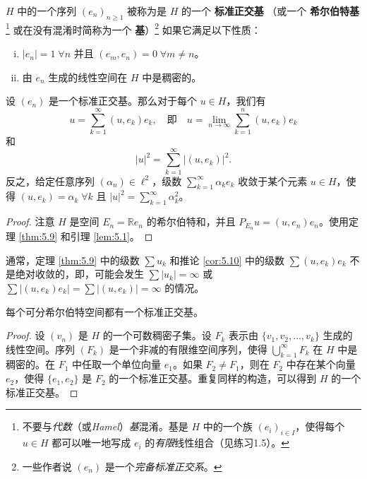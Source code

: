 \begin{definition}
$H$ 中的一个序列 $(e_n)_{n \ge 1}$ 被称为是 $H$ 的一个 \textbf{标准正交基} （或一个 \textbf{希尔伯特基}\footnote{不要与\textit{代数}（或\textit{Hamel}）\textit{基}混淆。基是 $H$ 中的一个族 $(e_i)_{i \in I}$，使得每个 $u \in H$ 都可以唯一地写成 $e_i$ 的\textit{有限}线性组合（见练习1.5）。} 或在没有混淆时简称为一个 \textbf{基}）\footnote{一些作者说 $(e_n)$ 是一个\textit{完备标准正交系}。} 如果它满足以下性质：
\begin{enumerate}[(i)]
    \item $|e_n|=1 \; \forall n$ 并且 $(e_m,e_n)=0 \; \forall m \ne n$。
    \item 由 $e_n$ 生成的线性空间在 $H$ 中是稠密的。
\end{enumerate}
\end{definition}

\begin{corollary}\label{cor:5.10}
设 $(e_n)$ 是一个标准正交基。那么对于每个 $u \in H$，我们有
\[ u = \sum_{k=1}^\infty (u,e_k)e_k, \quad \text{即} \quad u = \lim_{n\to\infty} \sum_{k=1}^n (u,e_k)e_k \]
和
\[ |u|^2 = \sum_{k=1}^\infty |(u,e_k)|^2. \]
反之，给定任意序列 $(\alpha_n) \in \ell^2$，级数 $\sum_{k=1}^\infty \alpha_k e_k$ 收敛于某个元素 $u \in H$，使得 $(u,e_k)=\alpha_k \; \forall k$ 且 $|u|^2 = \sum_{k=1}^\infty \alpha_k^2$。
\end{corollary}
\begin{proof}
注意 $H$ 是空间 $E_n = \mathbb{R} e_n$ 的希尔伯特和，并且 $P_{E_n} u = (u,e_n)e_n$。使用定理 \ref{thm:5.9} 和引理 \ref{lem:5.1}。
\end{proof}

\begin{remark}
通常，定理 \ref{thm:5.9} 中的级数 $\sum u_k$ 和推论 \ref{cor:5.10} 中的级数 $\sum (u,e_k)e_k$ 不是绝对收敛的，即，可能会发生 $\sum |u_k|=\infty$ 或 $\sum |(u,e_k)e_k| = \sum |(u,e_k)| = \infty$ 的情况。
\end{remark}

\begin{theorem}\label{thm:5.11}
每个可分希尔伯特空间都有一个标准正交基。
\end{theorem}
\begin{proof}
设 $(v_n)$ 是 $H$ 的一个可数稠密子集。设 $F_k$ 表示由 $\{v_1, v_2, \dots, v_k\}$ 生成的线性空间。序列 $(F_k)$ 是一个非减的有限维空间序列，使得 $\bigcup_{k=1}^\infty F_k$ 在 $H$ 中是稠密的。在 $F_1$ 中任取一个单位向量 $e_1$。如果 $F_2 \ne F_1$，则在 $F_2$ 中存在某个向量 $e_2$，使得 $\{e_1, e_2\}$ 是 $F_2$ 的一个标准正交基。重复同样的构造，可以得到 $H$ 的一个标准正交基。
\end{proof}

